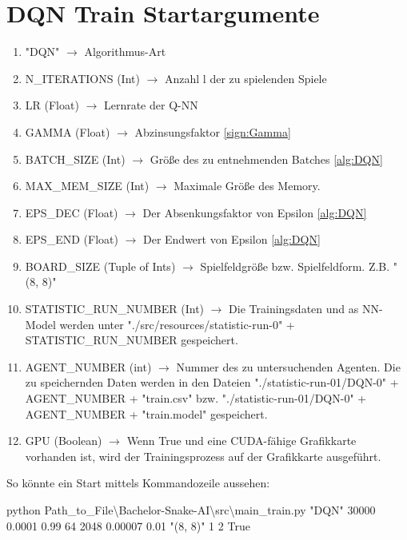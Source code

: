 \section{DQN Train Startargumente}
\begin{enumerate}
	\item "DQN" $\longrightarrow$ Algorithmus-Art
	\item N\_ITERATIONS (Int) $\longrightarrow$ Anzahl l der zu spielenden Spiele
	\item LR (Float) $\longrightarrow$ Lernrate der Q-NN
	\item GAMMA (Float) $\longrightarrow$ Abzinsungsfaktor \ref{sign:Gamma}
	\item BATCH\_SIZE (Int) $\longrightarrow$ Größe des zu entnehmenden Batches \ref{alg:DQN}
	\item MAX\_MEM\_SIZE (Int) $\longrightarrow$ Maximale Größe des Memory.
	\item EPS\_DEC (Float) $\longrightarrow$ Der Absenkungsfaktor von Epsilon \ref{alg:DQN}
	\item EPS\_END (Float) $\longrightarrow$ Der Endwert von Epsilon \ref{alg:DQN}
	\item BOARD\_SIZE (Tuple of Ints) $\longrightarrow$ Spielfeldgröße bzw. Spielfeldform. Z.B. "(8, 8)"
	\item STATISTIC\_RUN\_NUMBER (Int) $\longrightarrow$ Die Trainingsdaten und as NN-Model werden unter "./src/resources/statistic-run-0" + STATISTIC\_RUN\_NUMBER gespeichert.
	\item AGENT\_NUMBER (int) $\longrightarrow$ Nummer des zu untersuchenden Agenten. Die zu speichernden Daten werden in den Dateien "./statistic-run-01/DQN-0" + AGENT\_NUMBER + "train.csv" bzw. "./statistic-run-01/DQN-0" + AGENT\_NUMBER + "train.model" gespeichert.
	\item GPU (Boolean) $\longrightarrow$ Wenn True und eine CUDA-fähige Grafikkarte vorhanden ist, wird der Trainingsprozess auf der Grafikkarte ausgeführt.
\end{enumerate}
So könnte ein Start mittels Kommandozeile aussehen:
\begin{center}
	python Path\_to\_File\textbackslash Bachelor-Snake-AI\textbackslash src\textbackslash main\_train.py "DQN"{} 30000 0.0001 0.99 64 2048 0.00007 0.01 "(8, 8)"{} 1 2 True
\end{center}

